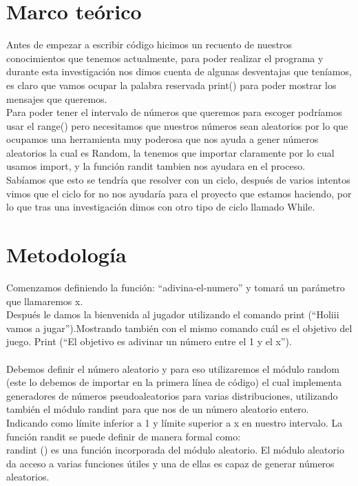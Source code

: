 \documentclass[12pt]{article}
\begin{document}
\section{Marco teórico}
Antes de empezar a escribir código hicimos un recuento de nuestros conocimientos que tenemos actualmente, para poder realizar el programa y durante esta investigación nos dimos cuenta de algunas desventajas que teníamos, es claro que vamos ocupar la palabra reservada print() para poder mostrar los mensajes que queremos.\\
Para poder tener el intervalo de números que queremos para escoger podríamos usar el range() pero necesitamos que nuestros números sean aleatorios por lo que ocupamos una herramienta muy poderosa que nos ayuda a gener números aleatorios la cual es Random, la tenemos que importar claramente por lo cual usamos import, y la función randit tambien nos ayudara en el proceso.\\
Sabíamos que esto se tendría que resolver con un ciclo, después de varios intentos vimos que el ciclo for no nos ayudaría para el proyecto que estamos haciendo, por lo que tras una investigación dimos con otro tipo de ciclo llamado While.

\section{Metodología} 

Comenzamos definiendo la función: “adivina-el-numero” y tomará un parámetro que llamaremos x. \\
Después le damos la bienvenida al jugador utilizando el comando print (“Holiii vamos a jugar”).Mostrando también con el mismo comando cuál es el objetivo del juego. Print (“El objetivo es adivinar un número entre el 1 y el x”).\\
\\
Debemos definir el número aleatorio y para eso utilizaremos el módulo random (este lo debemos de importar en la primera línea de código) el cual implementa generadores de números pseudoaleatorios para varias distribuciones, utilizando también el módulo randint para que nos de un número aleatorio entero. Indicando como límite inferior a 1 y límite superior a x en nuestro intervalo.
La función randit se puede definir de manera formal como:\\
randint () es una función incorporada del módulo aleatorio. El módulo aleatorio da acceso a varias funciones útiles y una de ellas es capaz de generar números aleatorios.\\
\end{document}
